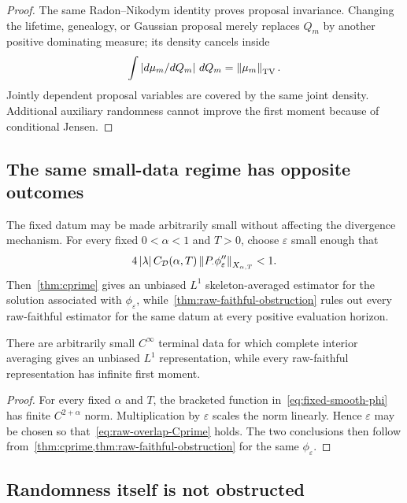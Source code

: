 \begin{proof}
The same Radon--Nikodym identity proves proposal invariance. Changing the lifetime, genealogy, or Gaussian proposal merely replaces $Q_m$ by another positive dominating measure; its density cancels inside
\begin{equation*}
  \int\left|d\mu_m/dQ_m\right|\,dQ_m
  =
  \left\lVert\mu_m\right\rVert_{\mathrm{TV}}.
\end{equation*}
Jointly dependent proposal variables are covered by the same joint density. Additional auxiliary randomness cannot improve the first moment because of conditional Jensen.
\end{proof}

\subsection{The same small-data regime has opposite outcomes}

The fixed datum may be made arbitrarily small without affecting the divergence mechanism. For every fixed $0<\alpha<1$ and $T>0$, choose $\varepsilon$ small enough that
\begin{equation}
  4\left|\lambda\right| C_{\mathcal D}(\alpha,T)
  \left\lVert P_\cdot\phi_\varepsilon''\right\rVert_{X_{\alpha,T}}<1.
  \label{eq:raw-overlap-Cprime}
\end{equation}
Then~\cref{thm:cprime} gives an unbiased $L^1$ skeleton-averaged estimator for the solution associated with $\phi_\varepsilon$, while~\cref{thm:raw-faithful-obstruction} rules out every raw-faithful estimator for the same datum at every positive evaluation horizon.

\begin{corollary}
\label{cor:clean-contrast}
There are arbitrarily small $C^\infty$ terminal data for which complete interior averaging gives an unbiased $L^1$ representation, while every raw-faithful representation has infinite first moment.
\end{corollary}

\begin{proof}
For every fixed $\alpha$ and $T$, the bracketed function in~\eqref{eq:fixed-smooth-phi} has finite $C^{2+\alpha}$ norm. Multiplication by $\varepsilon$ scales the norm linearly. Hence $\varepsilon$ may be chosen so that~\eqref{eq:raw-overlap-Cprime} holds. The two conclusions then follow from~\cref{thm:cprime,thm:raw-faithful-obstruction} for the same $\phi_\varepsilon$.
\end{proof}

\subsection{Randomness itself is not obstructed}

